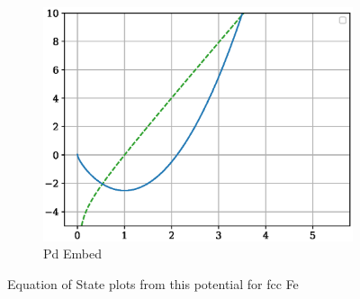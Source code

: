 \begin{figure}[htb]
\begin{subfigure}{.32\textwidth}
  \includegraphics[width=.94\linewidth]{chapters/results_potential_fitting/fepd_potential/pd_embe.eps}  
  \caption{Pd Embed}
  \label{fig:fepd-pot-pdembe}
\end{subfigure}
\label{fig:fig:fepd-fefcc-equation-of-state}
\caption{Equation of State plots from this potential for \acrshort{fcc} Fe}
\end{figure}



